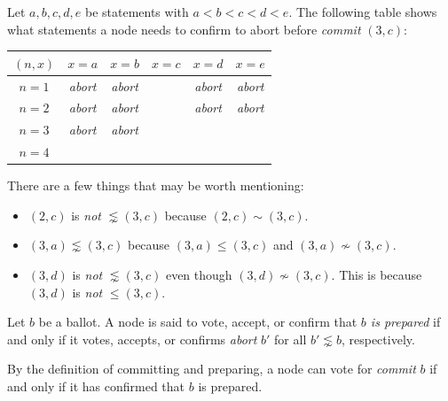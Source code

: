 \begin{exmp}
    Let $a, b, c, d, e$ be statements with $a < b < c < d < e$.
    The following table shows what statements a node needs to confirm to abort before \textit{commit} $(3, c)$:
    \begin{center}
        \begin{tabular}{|c|c|c|c|c|c|}
            \hline
            $(n, x)$ & $x = a$        & $x = b$        & $x = c$ & $x = d$        & $x = e$        \\ \hline
            $n = 1$  & \textit{abort} & \textit{abort} &         & \textit{abort} & \textit{abort} \\ \hline
            $n = 2$  & \textit{abort} & \textit{abort} &         & \textit{abort} & \textit{abort} \\ \hline
            $n = 3$  & \textit{abort} & \textit{abort} &         &                &                \\ \hline
            $n = 4$  &                &                &         &                &                \\ \hline
        \end{tabular}
    \end{center}

    There are a few things that may be worth mentioning:
    \begin{itemize}
        \item
            $(2, c)$ is \textit{not} $\lnsim (3, c)$ because $(2, c) \sim (3, c)$.
        \item
            $(3, a) \lnsim (3, c)$ because $(3, a) \leq (3, c)$ and $(3, a) \nsim (3, c)$.
        \item
            $(3, d)$ is \textit{not} $\lnsim (3, c)$ even though $(3, d) \nsim (3, c)$.
            This is because $(3, d)$ is \textit{not} $\leq (3, c)$.
    \end{itemize}
\end{exmp}

\begin{defn}[Prepare]
    Let $b$ be a ballot.
    A node is said to vote, accept, or confirm that \textit{$b$ is prepared} if and only if it votes, accepts, or confirms \textit{abort} $b'$ for all $b' \lnsim b$, respectively.
\end{defn}

\begin{rem}
    By the definition of committing and preparing, a node can vote for \textit{commit} $b$ if and only if it has confirmed that $b$ is prepared.
\end{rem}

